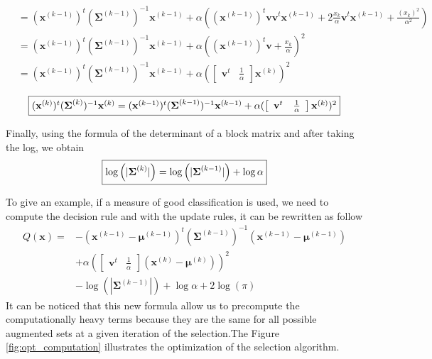 \documentclass[a4paper,11pt,DIV=16]{scrartcl}
\begin{document}
\begin{align*}
            &= (\mathbf{x}^{(k-1)})^t (\boldsymbol{\Sigma}^{(k-1)})^{-1} \mathbf{x}^{(k-1)} + \alpha ( (\mathbf{x}^{(k-1)})^t \mathbf{v} \mathbf{v}^t \mathbf{x}^{(k-1)}
               + 2 \frac{x_k}{\alpha} \mathbf{v}^t \mathbf{x}^{(k-1)} + \frac{(x_k)^2}{\alpha^2}) \\
            &= (\mathbf{x}^{(k-1)})^t (\boldsymbol{\Sigma}^{(k-1)})^{-1} \mathbf{x}^{(k-1)} + \alpha ( (\mathbf{x}^{(k-1)})^t \mathbf{v} + \frac{x_k}{\alpha} )^2 \\
            &= (\mathbf{x}^{(k-1)})^t (\boldsymbol{\Sigma}^{(k-1)})^{-1} \mathbf{x}^{(k-1)} + \alpha ( \left[\begin{array}{cc} \mathbf{v}^t & \frac{1}{\alpha} \end{array}\right] \mathbf{x}^{(k)} )^2
        \end{align*}

        \begin{equation}
            \fbox{$(\mathbf{x}^{(k)})^t (\boldsymbol{\Sigma}^{(k)})^{-1} \mathbf{x}^{(k)} = (\mathbf{x}^{(k-1)})^t (\boldsymbol{\Sigma}^{(k-1)})^{-1} \mathbf{x}^{(k-1)} + \alpha ( \left[\begin{array}{cc} \mathbf{v}^t & \frac{1}{\alpha} \end{array}\right] \mathbf{x}^{(k)} )^2$}
        \end{equation}

        Finally, using the formula of the determinant of a block matrix and after taking the log, we obtain
        \begin{equation}
            \fbox{$\log \left(|\boldsymbol{\Sigma}^{(k)}|\right) = \log \left(|\boldsymbol{\Sigma}^{(k-1)}|\right) + \log \alpha$}
        \end{equation}

        To give an example, if a measure of good classification is used, we need to compute the decision rule and with the update rules, it can be rewritten as follow
        \begin{align*}
            Q(\mathbf{x}) = &- (\mathbf{x}^{(k-1)} - \boldsymbol{\mu}^{(k-1)})^t (\boldsymbol{\Sigma}^{(k-1)})^{-1} (\mathbf{x}^{(k-1)} - \boldsymbol{\mu}^{(k-1)}) \\
            &+ \alpha ( \left[\begin{array}{cc} \mathbf{v}^t & \frac{1}{\alpha} \end{array}\right] (\mathbf{x}^(k) - \boldsymbol{\mu}^{(k)}) )^2 \\
            &- \log \left(|\boldsymbol{\Sigma}^{(k-1)}|\right) + \log \alpha  + 2 \log (\pi)
        \end{align*}
        It can be noticed that this new formula allow us to precompute the computationally heavy terms because they are the same for all possible augmented sets at a given iteration of the selection.The Figure \ref{fig:opt_computation} illustrates the optimization of the selection algorithm.
\end{document}
